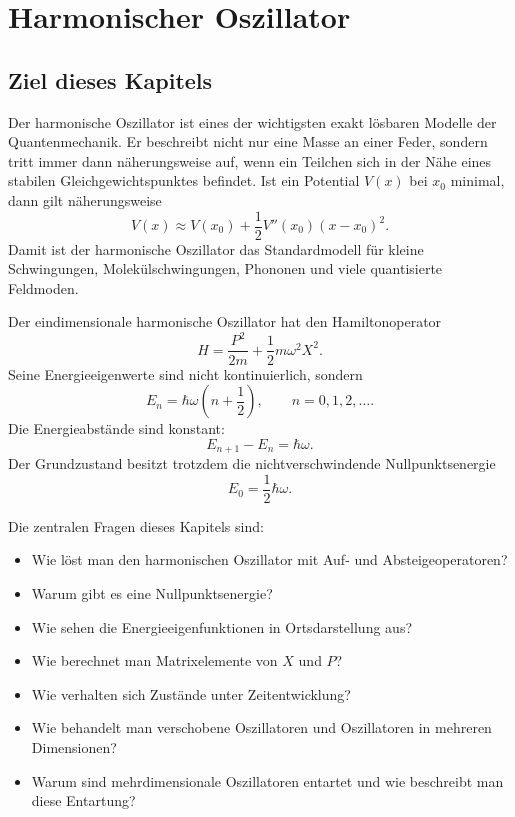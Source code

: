 \providecommand{\ket}[1]{\left|#1\right\rangle}
\providecommand{\bra}[1]{\left\langle#1\right|}
\providecommand{\braket}[2]{\left\langle#1\middle|#2\right\rangle}
\providecommand{\mel}[3]{\left\langle#1\middle|#2\middle|#3\right\rangle}

\chapter{Harmonischer Oszillator}

\section{Ziel dieses Kapitels}

Der harmonische Oszillator ist eines der wichtigsten exakt lösbaren Modelle der Quantenmechanik. Er beschreibt nicht nur eine Masse an einer Feder, sondern tritt immer dann näherungsweise auf, wenn ein Teilchen sich in der Nähe eines stabilen Gleichgewichtspunktes befindet. Ist ein Potential $V(x)$ bei $x_0$ minimal, dann gilt näherungsweise
\[
    V(x)\approx V(x_0)+\frac{1}{2}V''(x_0)(x-x_0)^2.
\]
Damit ist der harmonische Oszillator das Standardmodell für kleine Schwingungen, Molekülschwingungen, Phononen und viele quantisierte Feldmoden.

\begin{conceptbox}
Der eindimensionale harmonische Oszillator hat den Hamiltonoperator
\[
    H=\frac{P^2}{2m}+\frac{1}{2}m\omega^2X^2.
\]
Seine Energieeigenwerte sind nicht kontinuierlich, sondern
\[
    E_n=\hbar\omega\left(n+\frac12\right),\qquad n=0,1,2,\dots.
\]
Die Energieabstände sind konstant:
\[
    E_{n+1}-E_n=\hbar\omega.
\]
Der Grundzustand besitzt trotzdem die nichtverschwindende Nullpunktsenergie
\[
    E_0=\frac12\hbar\omega.
\]
\end{conceptbox}

Die zentralen Fragen dieses Kapitels sind:
\begin{itemize}
    \item Wie löst man den harmonischen Oszillator mit Auf- und Absteigeoperatoren?
    \item Warum gibt es eine Nullpunktsenergie?
    \item Wie sehen die Energieeigenfunktionen in Ortsdarstellung aus?
    \item Wie berechnet man Matrixelemente von $X$ und $P$?
    \item Wie verhalten sich Zustände unter Zeitentwicklung?
    \item Wie behandelt man verschobene Oszillatoren und Oszillatoren in mehreren Dimensionen?
    \item Warum sind mehrdimensionale Oszillatoren entartet und wie beschreibt man diese Entartung?
\end{itemize}

